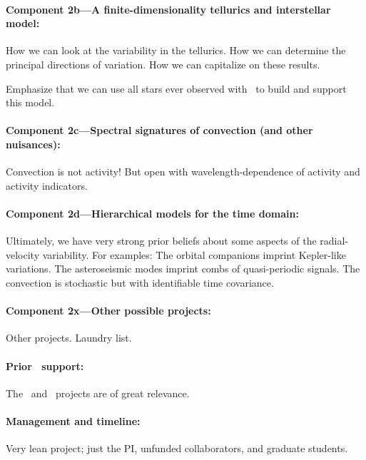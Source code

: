 \documentclass[12pt, fullpage, letterpaper]{article}
\begin{document}
\paragraph{Component 2b---A finite-dimensionality tellurics and interstellar model:}
How we can look at the variability in the tellurics.
How we can determine the principal directions of variation.
How we can capitalize on these results.

Emphasize that we can use all stars ever observed with \HARPS\ to
build and support this model.

\paragraph{Component 2c---Spectral signatures of convection (and other nuisances):}
Convection is not activity! But open with wavelength-dependence of
activity and activity indicators.

\paragraph{Component 2d---Hierarchical models for the time domain:}
Ultimately, we have very strong prior beliefs about some aspects
of the radial-velocity variability. For examples: The orbital
companions imprint Kepler-like variations. The asteroseismic modes
imprint combs of quasi-periodic signals. The convection is stochastic
but with identifiable time covariance.

\paragraph{Component 2x---Other possible projects:}
Other projects. Laundry list.

\paragraph{Prior \NASA\ support:}
The \GALEX\ and \Ktwo\ projects are of great relevance.

\paragraph{Management and timeline:}
Very lean project; just the PI, unfunded collaborators, and graduate students.
\end{document}
